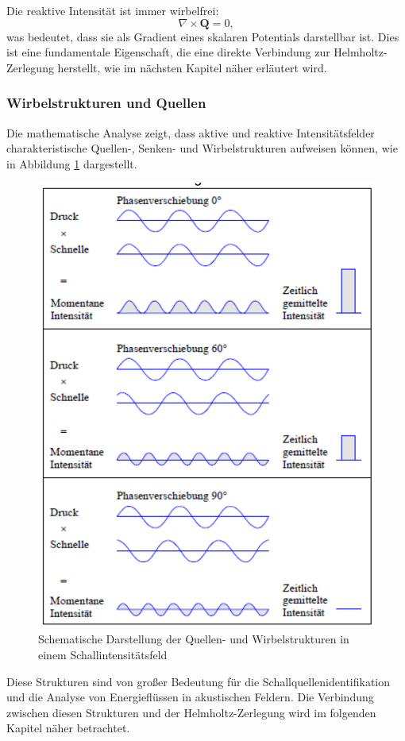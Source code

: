 Die reaktive Intensität ist immer wirbelfrei:
\begin{equation}
\nabla \times \boldsymbol{Q} = 0,
\end{equation}
was bedeutet, dass sie als Gradient eines skalaren Potentials darstellbar ist. Dies ist eine fundamentale Eigenschaft, die eine direkte Verbindung zur Helmholtz-Zerlegung herstellt, wie im nächsten Kapitel näher erläutert wird.

\subsubsection{Wirbelstrukturen und Quellen}

Die mathematische Analyse zeigt, dass aktive und reaktive Intensitätsfelder charakteristische Quellen-, Senken- und Wirbelstrukturen aufweisen können, wie in Abbildung \ref{fig:Schallintensitaet} dargestellt.

\begin{figure}
\centering
\includegraphics[scale=0.4]{papers/helmholtz/images/Schallintensitaet.png}
\caption{Schematische Darstellung der Quellen- und Wirbelstrukturen in einem Schallintensitätsfeld}
\label{fig:Schallintensitaet}
\end{figure}

Diese Strukturen sind von großer Bedeutung für die Schallquellenidentifikation und die Analyse von Energieflüssen in akustischen Feldern. Die Verbindung zwischen diesen Strukturen und der Helmholtz-Zerlegung wird im folgenden Kapitel näher betrachtet.




